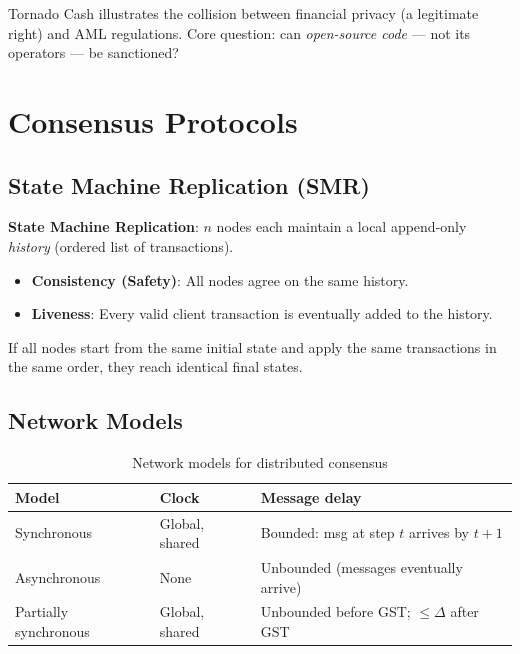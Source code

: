 \documentclass[12pt,a4paper,openany]{book}
\theoremstyle{definition}
\theoremstyle{plain}
\theoremstyle{remark}
\begin{document}
\begin{exambox}
  Tornado Cash illustrates the collision between financial privacy
  (a legitimate right) and AML regulations.  Core question: can
  \emph{open-source code} — not its operators — be sanctioned?
\end{exambox}


\chapter{Consensus Protocols}
\label{chap:consensus}

\section{State Machine Replication (SMR)}

\begin{definitionbox}
  \textbf{State Machine Replication}: $n$ nodes each maintain a local
  append-only \emph{history} (ordered list of transactions).
  \begin{itemize}
    \item \textbf{Consistency (Safety)}: All nodes agree on the same history.
    \item \textbf{Liveness}: Every valid client transaction is eventually
          added to the history.
  \end{itemize}
  If all nodes start from the same initial state and apply the same
  transactions in the same order, they reach identical final states.
\end{definitionbox}

\section{Network Models}

\begin{table}[h]
\centering
\caption{Network models for distributed consensus}
\begin{tabular}{p{3cm}p{4cm}p{5cm}}
\toprule
\textbf{Model} & \textbf{Clock} & \textbf{Message delay} \\
\midrule
Synchronous & Global, shared & Bounded: msg at step $t$ arrives by $t+1$ \\
Asynchronous & None & Unbounded (messages eventually arrive) \\
Partially synchronous & Global, shared & Unbounded before GST; $\leq\Delta$ after GST \\
\bottomrule
\end{tabular}
\end{table}
\end{document}

